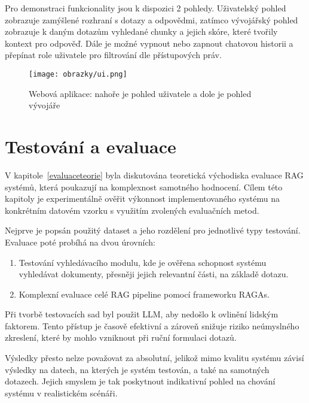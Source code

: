 Pro demonstraci funkcionality jsou k dispozici 2 pohledy. Uživatelský pohled zobrazuje zamýšlené rozhraní s dotazy a odpovědmi, zatímco vývojářský pohled zobrazuje k daným dotazům vyhledané chunky a jejich skóre, které tvořily kontext pro odpověď. Dále je možné vypnout nebo zapnout chatovou historii a přepínat role uživatele pro filtrování dle přístupových práv.

\begin{figure}[H]
    \centering
    \texttt{[image: obrazky/ui.png]}
    \caption{Webová aplikace: nahoře je pohled uživatele a dole je pohled vývojáře}
    \label{fig:gui}
\end{figure}



\chapter{Testování a evaluace}
\label{evaluace}

V kapitole~\ref{evaluaceteorie} byla diskutována teoretická východiska evaluace RAG systémů, která poukazují na komplexnost samotného hodnocení. Cílem této kapitoly je experimentálně ověřit výkonnost implementovaného systému na konkrétním datovém vzorku s využitím zvolených evaluačních metod.

Nejprve je popsán použitý dataset a jeho rozdělení pro jednotlivé typy testování. Evaluace poté probíhá na dvou úrovních: 
\begin{enumerate}
    \item Testování vyhledávacího modulu, kde je ověřena schopnost systému vyhledávat dokumenty, přesněji jejich relevantní části, na základě dotazu.
    \item Komplexní evaluace celé RAG pipeline pomocí frameworku RAGAs.
\end{enumerate}

Při tvorbě testovacích sad byl použit LLM, aby nedošlo k ovlinění lidským faktorem. Tento přístup je časově efektivní a zároveň snižuje riziko neúmyslného zkreslení, které by mohlo vzniknout při ruční formulaci dotazů. 

Výsledky přesto nelze považovat za absolutní, jelikož mimo kvalitu systému závisí výsledky na datech, na kterých je systém testován, a také na samotných dotazech. Jejich smyslem je tak poskytnout indikativní pohled na chování systému v realistickém scénáři.

